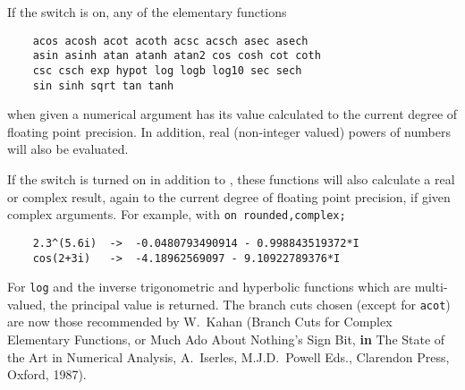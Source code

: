 If the switch  is on, any of the
elementary functions
\begin{verbatim}
    acos acosh acot acoth acsc acsch asec asech
    asin asinh atan atanh atan2 cos cosh cot coth
    csc csch exp hypot log logb log10 sec sech
    sin sinh sqrt tan tanh
\end{verbatim}
when given a numerical argument has its value calculated to the current
degree of floating point precision.  In addition, real (non-integer
valued) powers of numbers will also be evaluated.

If the  switch is turned on in addition to ,
these functions will also calculate a real or complex result, again to
the current degree of floating point precision,
if given complex arguments.  For example, with \texttt{on rounded,complex;}
\begin{verbatim}
    2.3^(5.6i)  ->  -0.0480793490914 - 0.998843519372*I
    cos(2+3i)   ->  -4.18962569097 - 9.10922789376*I
\end{verbatim}

For \texttt{log} and the inverse trigonometric and hyperbolic functions which are
multi-valued, the principal value is returned. The branch cuts chosen
(except for \texttt{acot}) are now
those recommended by W.~Kahan (Branch Cuts for Complex Elementary Functions,
or Much Ado About Nothing's Sign Bit,
\textbf{in} The State of the Art in Numerical Analysis,
A.~Iserles, M.J.D.~Powell Eds., Clarendon Press, Oxford, 1987).

